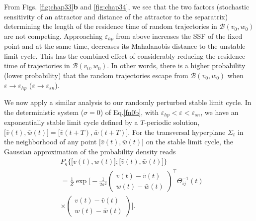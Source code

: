 From Figs. \ref{fig:chap33}\textbf{b} and \ref{fig:chap34}, we see that
the two factors (stochastic sensitivity of an  attractor and distance of the 
attractor to the separatrix) determining the length of the residence
time of random trajectories in $\mathcal{B}(v_0,w_0)$ are not 
competing. Approaching $\varepsilon_{hp}$ from above increases
the SSF of the fixed point and at the same time, decreases its
Mahalanobis distance to the unstable limit cycle. This has the combined
effect of considerably reducing the residence time of 
trajectories in $\mathcal{B}(v_0,w_0)$. In other words, there is a
higher probability (lower probability) that the random
trajectories escape from $\mathcal{B}(v_0,w_0)$ when $\varepsilon
\rightarrow \varepsilon_{hp}$ ($\varepsilon \rightarrow
\varepsilon_{sn}$).

We now apply a similar analysis to our randomly perturbed stable
limit cycle. In the deterministic system ($\sigma=0$) of
Eq.\eqref{fn0b}, with
$\varepsilon_{hp}<\varepsilon<\varepsilon_{sn}$, we have an
exponentially stable limit cycle defined by a $T$-periodic
solution,
$\big[\bar{v}(t),\bar{w}(t)\big]=\big[\bar{v}(t+T),\bar{w}(t+T)\big]$.
For the transversal hyperplane $\varSigma_{t}$ in the
neighborhood of any point $\big[\bar{v}(t),\bar{w}(t)\big]$ on the
stable limit cycle, the Gaussian approximation of the probability
density reads
\begin{align}\label{fn56}\nonumber
&P_g\Big\{\big[v(t),w(t)\big];[\bar{v}(t),\bar{w}(t)\big]\Big\}\\  \nonumber
&=\frac{1}{Z}\exp\Bigg[-\frac{1}{2\sigma^2}
\left(\begin{array}{c}
 v(t)-\bar{v}(t)\\w(t)-\bar{w}(t)
\end{array}\right)^{\top}\Theta_{ij}^{-1}(t)\\
&\times\left(\begin{array}{c}
 v(t)-\bar{v}(t)\\w(t)-\bar{w}(t)
\end{array}\right)\Bigg].
\end{align}

